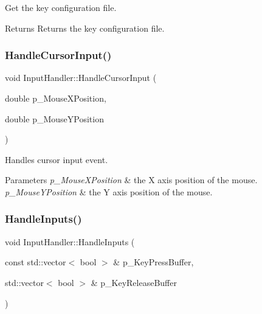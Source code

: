 Get the key configuration file. 

\begin{DoxyReturn}{Returns}
Returns the key configuration file. 
\end{DoxyReturn}
\mbox{\label{class_input_handler_a8d92172cce174850b2466ffbf536806c}} 
\subsubsection{\texorpdfstring{HandleCursorInput()}{HandleCursorInput()}}
{\footnotesize\ttfamily void Input\+Handler\+::\+Handle\+Cursor\+Input (\begin{DoxyParamCaption}\item[{double}]{p\+\_\+\+Mouse\+X\+Position,  }\item[{double}]{p\+\_\+\+Mouse\+Y\+Position }\end{DoxyParamCaption})}



Handles cursor input event. 


\begin{DoxyParams}{Parameters}
{\em p\+\_\+\+Mouse\+X\+Position} & the X axis position of the mouse. \\
\hline
{\em p\+\_\+\+Mouse\+Y\+Position} & the Y axis position of the mouse. \\
\hline
\end{DoxyParams}
\mbox{\label{class_input_handler_af78cb28dba7b65f56c6c48949d2c06cf}} 
\subsubsection{\texorpdfstring{HandleInputs()}{HandleInputs()}}
{\footnotesize\ttfamily void Input\+Handler\+::\+Handle\+Inputs (\begin{DoxyParamCaption}\item[{const std\+::vector$<$ bool $>$ \&}]{p\+\_\+\+Key\+Press\+Buffer,  }\item[{std\+::vector$<$ bool $>$ \&}]{p\+\_\+\+Key\+Release\+Buffer }\end{DoxyParamCaption})}



